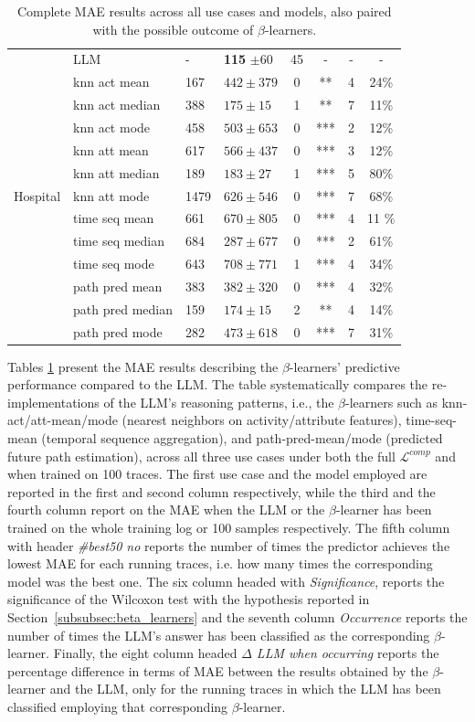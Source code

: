\documentclass[manuscript,screen,review]{acmart}
\newcommand{\ML}{\mathcal{L}}
\begin{document}
\begin{table}[t!]
{\begin{tabular}{|l|l|l|l|c|c|c|c|}
\multirow{13}{*}{Hospital}
& LLM & -  & \textbf{115} $\pm 60$ & 45 &-  &- &-\\
& knn act mean  & 167 & $442 \pm 379$ & 0 & **  &4 & 24\%\\
& knn act median  & 388 & $175 \pm 15$ & 1 & **  &7 & 11\%\\
& knn act mode  & 458 & $503 \pm 653$ & 0 & ***  &2 & 12\%\\
& knn att mean  & 617 & $566 \pm 437$ & 0 & ***  &3 & 12\%\\
& knn att median  & 189 & $183 \pm 27$ & 1 & ***  &5 & 80\%\\
& knn att mode  & 1479 & $626 \pm 546$ & 0 & ***  &7 & 68\%\\
& time seq mean  & 661 & $670 \pm 805$ & 0 & ***  &4 & 11 \%\\
& time seq median  & 684 & $287 \pm 677$ & 0 & ***  &2 & 61\%\\
& time seq mode  & 643 & $708 \pm 771$ & 1 & ***  &4 & 34\%\\
& path pred mean  & 383 & $382 \pm 320$ & 0 & ***  &4 & 32\%\\
& path pred median  & 159 & $174 \pm 15$ & 2 & **  &4 & 14\%\\
& path pred mode  & 282 & $473 \pm 618$ & 0 & ***  &7 & 31\%\\
\hline
\end{tabular}}
\caption{Complete MAE results across all use cases and models, also paired with the possible outcome of $\beta$-learners.}
\label{tab:mae_results}
\end{table}

Tables \ref{tab:mae_results} present the MAE results describing the $\beta$-learners’ predictive performance compared to the LLM. The table systematically compares the re-implementations of the LLM’s reasoning patterns, i.e., the $\beta$-learners such as knn-act/att-mean/mode (nearest neighbors on activity/attribute features), time-seq-mean (temporal sequence aggregation), and path-pred-mean/mode (predicted future path estimation), across all three use cases under both the full $\ML^{comp}$ and when trained on 100 traces. The first use case and the model employed are reported in the first and second column respectively, while the third and the fourth column report on the MAE when the LLM or the $\beta$-learner has been trained on the whole training log or 100 samples respectively. The fifth column with header \textit{\#best50 no} reports the number of times the predictor achieves the lowest MAE for each running traces, i.e. how many times the corresponding model was the best one. The six column headed with \textit{Significance}, reports the significance of the Wilcoxon test with the hypothesis reported in Section~\ref{subsubsec:beta_learners} and the seventh column \textit{Occurrence} reports the number of times the LLM's answer has been classified as the corresponding $\beta$-learner. Finally, the eight column headed \textit{$\Delta$ LLM when occurring} reports the percentage difference in terms of MAE between the results obtained by the $\beta$-learner and the LLM, only for the running traces in which the LLM has been classified employing that corresponding $\beta$-learner. 
\end{document}
